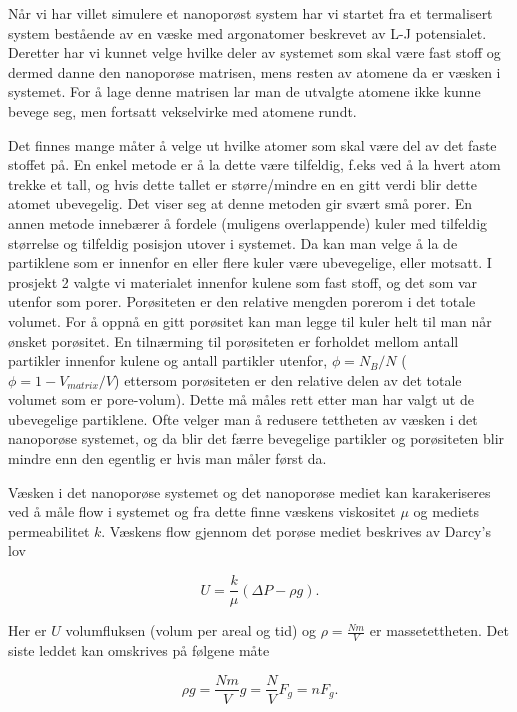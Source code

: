\documentclass[a4paper,10pt]{article}
\begin{document}
Når vi har villet simulere et nanoporøst system har vi startet fra et termalisert system bestående av en væske med argonatomer beskrevet av L-J potensialet. Deretter har vi kunnet velge hvilke deler av systemet som skal være fast stoff og dermed danne den nanoporøse matrisen, mens resten av atomene da er væsken i systemet. For å lage denne matrisen lar man de utvalgte atomene ikke kunne bevege seg, men fortsatt vekselvirke med atomene rundt. 

Det finnes mange måter å velge ut hvilke atomer som skal være del av det faste stoffet på. En enkel metode er å la dette være tilfeldig, f.eks ved å la hvert atom trekke et tall, og hvis dette tallet er større/mindre en en gitt verdi blir dette atomet ubevegelig. Det viser seg at denne metoden gir svært små porer. En annen metode innebærer å fordele (muligens overlappende) kuler med tilfeldig størrelse og tilfeldig posisjon utover i systemet. Da kan man velge å la de partiklene som er innenfor en eller flere kuler være ubevegelige, eller motsatt. I prosjekt 2 valgte vi materialet innenfor kulene som fast stoff, og det som var utenfor som porer. Porøsiteten er den relative mengden porerom i det totale volumet. For å oppnå en gitt porøsitet kan man legge til kuler helt til man når ønsket porøsitet. En tilnærming til porøsiteten er forholdet mellom antall partikler innenfor kulene og antall partikler utenfor, $\phi = N_B/N$ ($\phi = 1-V_{matrix}/V$) ettersom porøsiteten er den relative delen av det totale volumet som er pore-volum). Dette må måles rett etter man har valgt ut de ubevegelige partiklene. Ofte velger man å redusere tettheten av væsken i det nanoporøse systemet, og da blir det færre bevegelige partikler og porøsiteten blir mindre enn den egentlig er hvis man måler først da. 

Væsken i det nanoporøse systemet og det nanoporøse mediet kan karakeriseres ved å måle flow i systemet og fra dette finne væskens viskositet $\mu$ og mediets permeabilitet $k$. Væskens flow gjennom det porøse mediet beskrives av Darcy's lov

\begin{equation}
 U = \frac{k}{\mu}(\Delta P -\rho g).
\end{equation}

Her er $U$ volumfluksen (volum per areal og tid) og $\rho=\frac{Nm}{V}$ er massetettheten. Det siste leddet kan omskrives på følgene måte

\begin{equation}
 \rho g = \frac{Nm}{V}g = \frac{N}{V}F_g = nF_g.
\end{equation}
\end{document}

